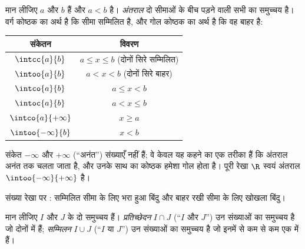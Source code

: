 \begin{definition}[अंतराल]\label{def:g10:numbers:interval}
मान लीजिए $a$ और $b$  हैं और $a < b$ है।
\emph{अंतराल} दो सीमाओं के बीच पड़ने वाली सभी  का समुच्चय है। वर्ग कोष्ठक का अर्थ है कि सीमा सम्मिलित है, और
गोल कोष्ठक का अर्थ है कि वह बाहर है:
\begin{center}
\begin{tabular}{c|c}
संकेतन & विवरण \\
\hline
$\intcc{a}{b}$ & $a \leq x \leq b$ (दोनों सिरे सम्मिलित) \\
$\intoo{a}{b}$ & $a < x < b$ (दोनों सिरे बाहर) \\
$\intco{a}{b}$ & $a \leq x < b$ \\
$\intoc{a}{b}$ & $a < x \leq b$ \\
$\intco{a}{+\infty}$ & $x \geq a$ \\
$\intoo{-\infty}{b}$ & $x < b$ \\
\end{tabular}
\end{center}
संकेत $-\infty$ और $+\infty$ (``अनंत'') संख्याएँ नहीं हैं; वे केवल यह कहने का एक
तरीका हैं कि अंतराल अनंत तक चलता जाता है, और उनके साथ का कोष्ठक हमेशा
गोल होता है। पूरी रेखा $\R$ स्वयं अंतराल $\intoo{-\infty}{+\infty}$ है।
\end{definition}

\begin{omfigure}

{\small संख्या रेखा पर : सम्मिलित सीमा के लिए भरा हुआ बिंदु और
बाहर रखी सीमा के लिए खोखला बिंदु।}
\end{omfigure}

\begin{definition}[प्रतिच्छेदन और सम्मिलन]\label{def:g10:numbers:interunion}
मान लीजिए $I$ और $J$  के दो समुच्चय हैं।
\emph{प्रतिच्छेदन} $I \cap J$ (``$I$ और $J$'') उन
संख्याओं का समुच्चय है जो दोनों में हैं; \emph{सम्मिलन}
$I \cup J$ (``$I$ या $J$'') उन संख्याओं का समुच्चय है जो इनमें से कम से कम
एक में हैं।
\end{definition}

